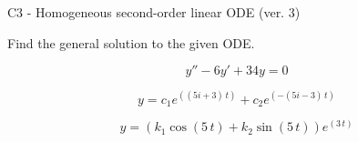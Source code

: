 \begin{exercise}
  \begin{exerciseTitle}C3 - Homogeneous second-order linear ODE (ver. 3)\end{exerciseTitle}
  \begin{exerciseStatement}
    
Find the general solution to the given ODE.

    
\[y''-6y'+34y = 0\]

  \end{exerciseStatement}
  \begin{exerciseAnswer}
    
\[y= c_{1} e^{\left(\left(5 i + 3\right) \, t\right)} + c_{2} e^{\left(-\left(5 i - 3\right) \, t\right)}\]

    
\[y= {\left(k_{1} \cos\left(5 \, t\right) + k_{2} \sin\left(5 \, t\right)\right)} e^{\left(3 \, t\right)}\]

  \end{exerciseAnswer}
\end{exercise}